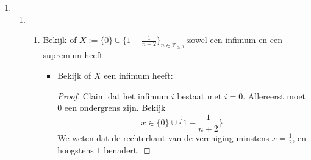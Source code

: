 \documentclass{article}
\newcommand{\f}[2]{\frac{#1}{#2}}
\newcommand{\ol}[1]{\overline{#1}}
\newcommand{\Z}{\mathbb{Z}}
\newcommand{\Q}{\mathbb{Q}}
\newcommand{\q}[1]{#1/_\sim}
\begin{document}
\begin{enumerate}[label=\arabic*]
\begin{enumerate}[label=\alph*)]
                        Als we nu gaan kijken naar \(\Q/_\sim\),
                        dan kunnen we elke equivalentie-klasse
                        \(\ol{q}\) kunnen schrijven als:
                        \[\ol{q} = \ol{\f{1}{k}} = \{(\f{k(i) + 1}{k}) : i \in \Z\}\]
                        Hieruit volgt dus dat we oneindig equivalentie-klassen hebben want
                        we kunnen een bijectie opstellen vanuit \(f:\Z \rightarrow (0, 1]\) met \(f(k) = \f{1}{k}\), en dus
                        zijn het aantal equivalentie-klassen aftelbaar oneindig.
                        Daarnaast heeft elke equivalentie-klasse oneindig elementen omdat:
                        \[\f{k(i) + 1}{k} = i + \f{1}{k}\]
                        We kunnen dit zien als een strikt stijgende lijn,
                        en dus moet elke equivalentie-klasse oneindig aantal elementen bevatten.
                  \item
                        Ik denk niet dat dit kan. Ik stel voor dat het wel kan, en probeer een tegenspraak te herleiden.
                        \begin{proof}
                              Stel dat er een Quotiëntruimte bestaat waarbij $|\q{Q}| = n$, en $|\ol{q}| = m$, waarbij $\ol{q} \in \q{Q}$,
                              We weten dat $(\q{Q})$ partities vormen in \(\Q\).
                              Dit betekent dus dat $\Q$ partities $\ol{q}$ moet vormen waarbij
                              elk element van $\Q$ opgedeeld wordt, echter
                              geldt voor $|\ol{q}| = m$ en $|\q{Q}| = n$, en dus zijn
                              er hoogstens $n\cdot m$ aantal elementen. Dit luidt tot een
                              tegenspraak want $n \cdot m < \infty = |\Q|$.
                        \end{proof}
            \end{enumerate}
      \item
            \begin{enumerate}[label=\alph*)]
                  \item \begin{enumerate}
                              \item Bekijk of $X:= \{0\} \cup \{1 - \f{1}{n+2}\}_{n \in \Z_{\geq 0}}$ zowel een infimum en een supremum heeft.
                                    \begin{itemize}
                                          \item Bekijk of $X$ een infimum heeft:
                                                \begin{proof}
                                                      Claim dat het infimum $i$ bestaat met $i = 0$.
                                                      Allereerst moet $0$ een ondergrens zijn.
                                                      Bekijk \[x \in \{0\} \cup \{1 - \f{1}{n+2}\}\]
                                                      We weten dat de rechterkant van de vereniging minstens
                                                      $x = \f{1}{2}$, en hoogstens $1$ benadert.


\end{proof}
\end{itemize}
\end{enumerate}
\end{enumerate}
\end{enumerate}
\end{document}
